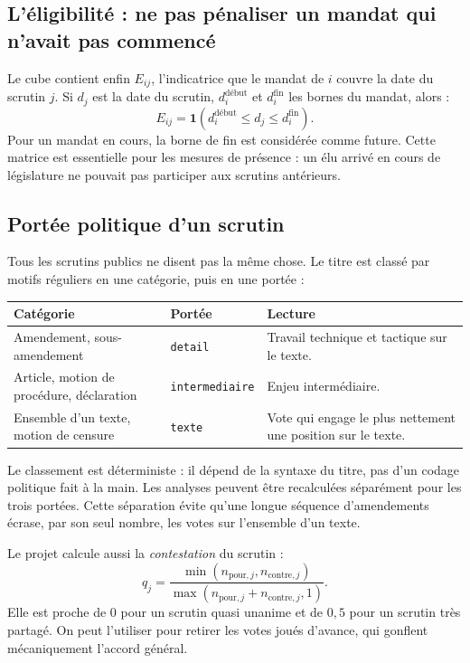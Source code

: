 \documentclass[11pt,a4paper]{article}
\newcommand{\ind}{\mathbf{1}}
\newcommand{\code}[1]{\texttt{#1}}
\begin{document}
\subsection{L'éligibilité : ne pas pénaliser un mandat qui n'avait pas commencé}

Le cube contient enfin $E_{ij}$, l'indicatrice que le mandat de $i$ couvre la
date du scrutin $j$. Si $d_j$ est la date du scrutin, $d_i^{\mathrm{début}}$ et
$d_i^{\mathrm{fin}}$ les bornes du mandat, alors :
\[
 E_{ij}=\ind\left(d_i^{\mathrm{début}}\leq d_j\leq
 d_i^{\mathrm{fin}}\right).
\]
Pour un mandat en cours, la borne de fin est considérée comme future. Cette
matrice est essentielle pour les mesures de présence : un élu arrivé en cours
de législature ne pouvait pas participer aux scrutins antérieurs.

\subsection{Portée politique d'un scrutin}

Tous les scrutins publics ne disent pas la même chose. Le titre est classé par
motifs réguliers en une catégorie, puis en une portée :

\begin{center}
\begin{tabular}{>{\raggedright\arraybackslash}p{.25\linewidth}p{.30\linewidth}p{.32\linewidth}}
\toprule
Catégorie & Portée & Lecture \\
\midrule
Amendement, sous-amendement & \code{detail} & Travail technique et tactique sur le texte. \\
Article, motion de procédure, déclaration & \code{intermediaire} & Enjeu intermédiaire. \\
Ensemble d'un texte, motion de censure & \code{texte} & Vote qui engage le plus nettement une position sur le texte. \\
\bottomrule
\end{tabular}
\end{center}

Le classement est déterministe : il dépend de la syntaxe du titre, pas d'un
codage politique fait à la main. Les analyses peuvent être recalculées séparément
pour les trois portées. Cette séparation évite qu'une longue séquence
d'amendements écrase, par son seul nombre, les votes sur l'ensemble d'un texte.

Le projet calcule aussi la \emph{contestation} du scrutin :
\[
 q_j=\frac{\min(n_{\mathrm{pour},j},n_{\mathrm{contre},j})}
 {\max(n_{\mathrm{pour},j}+n_{\mathrm{contre},j},1)}.
\]
Elle est proche de $0$ pour un scrutin quasi unanime et de $0{,}5$ pour un
scrutin très partagé. On peut l'utiliser pour retirer les votes joués d'avance,
qui gonflent mécaniquement l'accord général.
\end{document}

